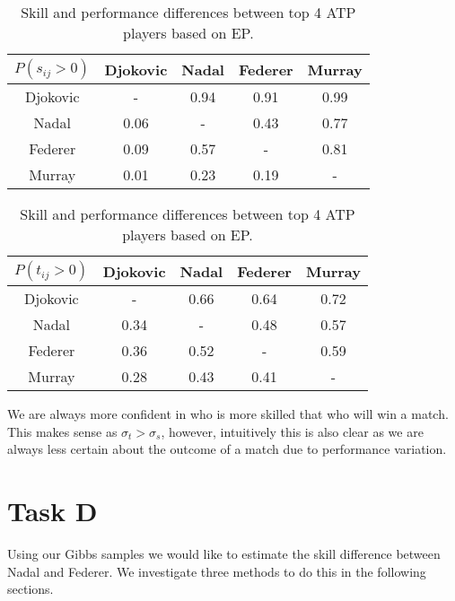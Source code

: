 \documentclass[11pt]{article}
\begin{document}
\begin{table}
    \centering
    \small
    \setlength{\tabcolsep}{2pt}
    \begin{minipage}{0.49\textwidth}
        \small
        \centering
        \begin{tabular}{|c|c c c c|}
            \hline
            $P(s_{ij}>0)$ & Djokovic & Nadal & Federer & Murray \\
            \hline
            Djokovic & -    & 0.94 & 0.91 & 0.99 \\
            Nadal    & 0.06 & -    & 0.43 & 0.77 \\
            Federer  & 0.09 & 0.57 & -    & 0.81 \\
            Murray   & 0.01 & 0.23 & 0.19 & -    \\
            \hline
        \end{tabular}
        \label{tbl:B_skill_difference}
    \end{minipage}
    \begin{minipage}{0.49\textwidth}
        \small
        \centering
        \begin{tabular}{|c|c c c c|}
            \hline
            $P(t_{ij}>0)$ & Djokovic & Nadal & Federer & Murray \\
            \hline
            Djokovic & -    & 0.66 & 0.64 & 0.72 \\ 
            Nadal    & 0.34 & -    & 0.48 & 0.57 \\ 
            Federer  & 0.36 & 0.52 & -    & 0.59 \\ 
            Murray   & 0.28 & 0.43 & 0.41 & -    \\
            \hline
        \end{tabular}
        \label{tbl:B_performance_difference}
    \end{minipage}
    \caption{Skill and performance differences between top 4 ATP players based on EP.}
    \label{tbl:B_atp_probabilities}
\end{table}

We are always more confident in who is more skilled that who will win a match. This makes sense as $\sigma_t > \sigma_s$, however, intuitively this is also clear as we are always less certain about the outcome of a match due to performance variation.

\section{Task D}
Using our Gibbs samples we would like to estimate the skill difference between Nadal and Federer. We investigate three methods to do this in the following sections.
\end{document}

